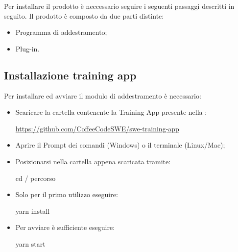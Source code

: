 \documentclass[../manuale-utente.tex]{subfiles}
\begin{document}
Per installare il prodotto è neccessario seguire i seguenti passaggi descritti in seguito. Il prodotto è composto da due parti distinte:
\begin{itemize}
  \item Programma di addestramento;
  \item Plug-in.
\end{itemize}

\subsection{Installazione training app}
\label{subs:installazione-training-app}
Per installare ed avviare il modulo di addestramento è necessario:
\begin{itemize}
  \item Scaricare la cartella contenente la Training App presente nella : \\
  \centerline{\url{https://github.com/CoffeeCodeSWE/swe-training-app}}
  \item Aprire il Prompt dei comandi (Windows) o il terminale (Linux/Mac);
  \item Posizionarsi nella cartella appena scaricata tramite: \\
  \centerline{cd / percorso}
  \item Solo per il primo utilizzo eseguire: \\
  \centerline{yarn install}
  \item Per avviare è sufficiente eseguire: \\
  \centerline{yarn start}
\end{itemize}
\end{document}
